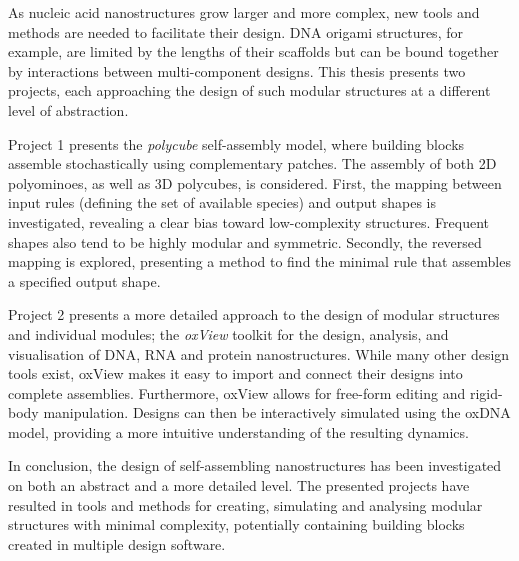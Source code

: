 
As nucleic acid nanostructures grow larger and more complex, new tools and methods are needed to facilitate their design. DNA origami structures, for example, are limited by the lengths of their scaffolds but can be bound together by interactions between multi-component designs. This thesis presents two projects, each approaching the design of such modular structures at a different level of abstraction.

Project 1 presents the \emph{polycube} self-assembly model, where building blocks assemble stochastically using complementary patches. The assembly of both 2D polyominoes, as well as 3D polycubes, is considered. First, the mapping between input rules (defining the set of available species) and output shapes is investigated, revealing a clear bias toward low-complexity structures. Frequent shapes also tend to be highly modular and symmetric. Secondly, the reversed mapping is explored, presenting a method to find the minimal rule that assembles a specified output shape.

Project 2 presents a more detailed approach to the design of modular structures and individual modules; the \emph{oxView} toolkit for the design, analysis, and visualisation of DNA, RNA and protein nanostructures. While many other design tools exist, oxView makes it easy to import and connect their designs into complete assemblies. Furthermore, oxView allows for free-form editing and rigid-body manipulation. Designs can then be interactively simulated using the oxDNA model, providing a more intuitive understanding of the resulting dynamics.

In conclusion, the design of self-assembling nanostructures has been investigated on both an abstract and a more detailed level. The presented projects have resulted in tools and methods for creating, simulating and analysing modular structures with minimal complexity, potentially containing building blocks created in multiple design software.